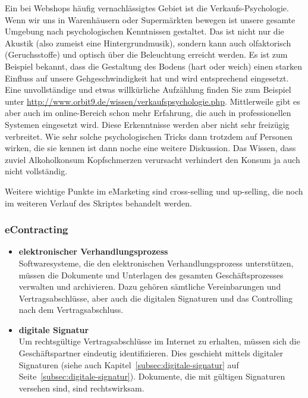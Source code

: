 Ein bei Webshops häufig vernachlässigtes Gebiet ist die Verkaufs-Psychologie.
Wenn wir uns in Warenhäusern oder Supermärkten bewegen ist unsere gesamte
Umgebung nach psychologischen Kenntnissen gestaltet. Das ist nicht nur
die Akustik (also zumeist eine Hintergrundmusik), sondern kann auch
olfaktorisch (Geruchsstoffe) und optisch über die Beleuchtung erreicht
werden. Es ist zum Beispiel bekannt, dass die Gestaltung des Bodens
(hart oder weich) einen starken Einfluss auf unsere Gehgeschwindigkeit hat
und wird entsprechend eingesetzt. Eine unvollständige und etwas willkürliche
Aufzählung finden Sie zum Beispiel unter
\href{http://www.orbit9.de/wissen/verkaufspsychologie.php}
{http://www.orbit9.de/wissen/verkaufspsychologie.php}.
Mittlerweile gibt es aber auch im online-Bereich schon mehr Erfahrung,
die auch in professionellen Systemen eingesetzt wird. Diese Erkenntnisse
werden aber nicht sehr freizügig verbreitet. Wie sehr solche psychologischen
Tricks dann trotzdem auf Personen wirken, die sie kennen ist dann noche
eine weitere Diskussion. Das Wissen, dass zuviel Alkoholkonsum Kopfschmerzen
verursacht verhindert den Konsum ja auch nicht vollständig.

Weitere wichtige Punkte im eMarketing sind cross-selling und up-selling,
die noch im weiteren Verlauf des Skriptes behandelt werden.

\subsubsection*{eContracting}

\begin{itemize}
    \item\textbf{elektronischer Verhandlungsprozess} \\
    Softwaresysteme, die den elektronischen Verhandlungsprozess
    unterstützen, müssen die Dokumente und Unterlagen des gesamten
    Geschäftsprozesses verwalten und archivieren. Dazu gehören sämtliche
    Vereinbarungen und Vertragsabschlüsse, aber auch die digitalen
    Signaturen und das Controlling nach dem Vertragsabschluss.
    \item\textbf{digitale Signatur} \\
    Um rechtsgültige Vertragsabschlüsse im Internet zu erhalten,
    müssen sich die Geschäftspartner eindeutig identifizieren.
    Dies geschieht mittels digitaler Signaturen
    (siehe auch Kapitel~\ref{subsec:digitale-signatur} auf Seite~\ref{subsec:digitale-signatur}).
    Dokumente, die mit gültigen Signaturen versehen sind, sind rechtswirksam.
\end{itemize}

